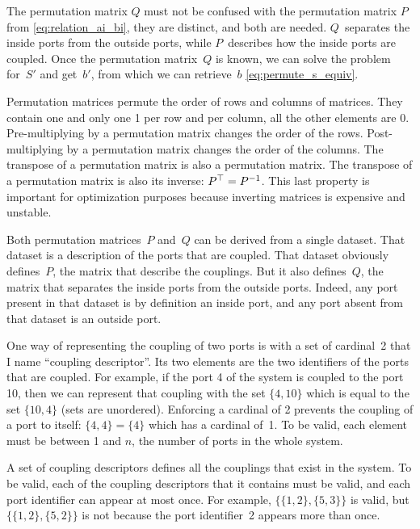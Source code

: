 The permutation matrix $Q$ must not be confused with the permutation matrix $P$ from \cref{eq:relation_ai_bi}, they are distinct, and both are needed.
$Q$~separates the inside ports from the outside ports, while $P$~describes how the inside ports are coupled.
Once the permutation matrix~$Q$ is known, we can solve the problem for~$S'$ and get~$b'$, from which we can retrieve~$b$ \cref{eq:permute_s_equiv}.

Permutation matrices permute the order of rows and columns of matrices.
They contain one and only one 1 per row and per column, all the other elements are 0.
Pre-multiplying by a permutation matrix changes the order of the rows.
Post-multiplying by a permutation matrix changes the order of the columns.
The transpose of a permutation matrix is also a permutation matrix.
The transpose of a permutation matrix is also its inverse: $P^\top = P^{-1}$.
This last property is important for optimization purposes because inverting matrices is expensive and unstable.

Both permutation matrices~$P$ and~$Q$ can be derived from a single dataset.
That dataset is a description of the ports that are coupled.
That dataset obviously defines~$P$, the matrix that describe the couplings.
But it also defines~$Q$, the matrix that separates the inside ports from the outside ports.
Indeed, any port present in that dataset is by definition an inside port, and any port absent from that dataset is an outside port.

One way of representing the coupling of two ports is with a set of cardinal~2 that I name ``coupling descriptor''.
Its two elements are the two identifiers of the ports that are coupled.
For example, if the port 4 of the system is coupled to the port 10, then we can represent that coupling with the set $\lbrace 4, 10\rbrace$ which is equal to the set $\lbrace 10, 4\rbrace$ (sets are unordered).
Enforcing a cardinal of 2 prevents the coupling of a port to itself: $\lbrace 4, 4\rbrace = \lbrace 4\rbrace$ which has a cardinal of~1.
To be valid, each element must be between 1 and $n$, the number of ports in the whole system.

A set of coupling descriptors defines all the couplings that exist in the system.
To be valid, each of the coupling descriptors that it contains must be valid, and each port identifier can appear at most once.
For example,
$\lbrace \lbrace 1, 2 \rbrace, \lbrace 5, 3 \rbrace \rbrace$
is valid, but 
$\lbrace \lbrace 1, 2 \rbrace, \lbrace 5, 2 \rbrace \rbrace$
is not because the port identifier~2 appears more than once.

